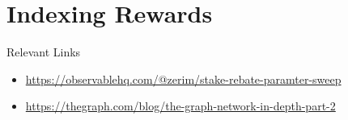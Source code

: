 \chapter{Indexing Rewards}
{\justifying

\lipsum[5-8]

\vspace*{1in}

\noindent Relevant Links
\begin{itemize}
    \item \url{https://observablehq.com/@zerim/stake-rebate-paramter-sweep}
    
    \item \url{https://thegraph.com/blog/the-graph-network-in-depth-part-2}
\end{itemize}
}
